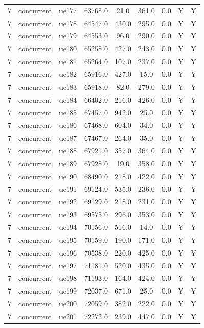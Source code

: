 \begin{table}[ht]
\begin{tabular}{|c|c|c|c|c|c|c|c|c|}
7 & concurrent & ue177 & 63768.0 & 21.0 & 361.0 & 0.0 & Y & Y \\
7 & concurrent & ue178 & 64547.0 & 430.0 & 295.0 & 0.0 & Y & Y \\
7 & concurrent & ue179 & 64553.0 & 96.0 & 290.0 & 0.0 & Y & Y \\
7 & concurrent & ue180 & 65258.0 & 427.0 & 243.0 & 0.0 & Y & Y \\
7 & concurrent & ue181 & 65264.0 & 107.0 & 237.0 & 0.0 & Y & Y \\
7 & concurrent & ue182 & 65916.0 & 427.0 & 15.0 & 0.0 & Y & Y \\
7 & concurrent & ue183 & 65918.0 & 82.0 & 279.0 & 0.0 & Y & Y \\
7 & concurrent & ue184 & 66402.0 & 216.0 & 426.0 & 0.0 & Y & Y \\
7 & concurrent & ue185 & 67457.0 & 942.0 & 25.0 & 0.0 & Y & Y \\
7 & concurrent & ue186 & 67468.0 & 604.0 & 34.0 & 0.0 & Y & Y \\
7 & concurrent & ue187 & 67467.0 & 264.0 & 35.0 & 0.0 & Y & Y \\
7 & concurrent & ue188 & 67921.0 & 357.0 & 364.0 & 0.0 & Y & Y \\
7 & concurrent & ue189 & 67928.0 & 19.0 & 358.0 & 0.0 & Y & Y \\
7 & concurrent & ue190 & 68490.0 & 218.0 & 422.0 & 0.0 & Y & Y \\
7 & concurrent & ue191 & 69124.0 & 535.0 & 236.0 & 0.0 & Y & Y \\
7 & concurrent & ue192 & 69129.0 & 218.0 & 231.0 & 0.0 & Y & Y \\
7 & concurrent & ue193 & 69575.0 & 296.0 & 353.0 & 0.0 & Y & Y \\
7 & concurrent & ue194 & 70156.0 & 516.0 & 14.0 & 0.0 & Y & Y \\
7 & concurrent & ue195 & 70159.0 & 190.0 & 171.0 & 0.0 & Y & Y \\
7 & concurrent & ue196 & 70538.0 & 220.0 & 425.0 & 0.0 & Y & Y \\
7 & concurrent & ue197 & 71181.0 & 520.0 & 435.0 & 0.0 & Y & Y \\
7 & concurrent & ue198 & 71193.0 & 164.0 & 424.0 & 0.0 & Y & Y \\
7 & concurrent & ue199 & 72037.0 & 671.0 & 25.0 & 0.0 & Y & Y \\
7 & concurrent & ue200 & 72059.0 & 382.0 & 222.0 & 0.0 & Y & Y \\
7 & concurrent & ue201 & 72272.0 & 239.0 & 447.0 & 0.0 & Y & Y \\

\end{tabular}
\end{table}
